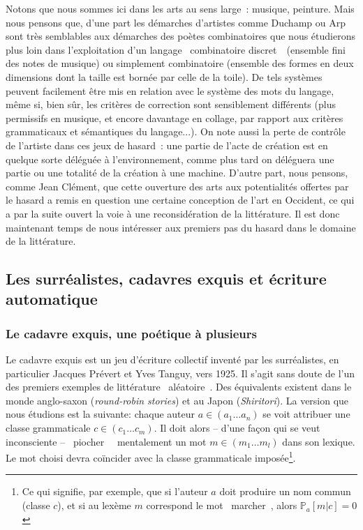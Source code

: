 \documentclass{article}
\begin{document}
			Notons que nous sommes ici dans les arts au sens large : musique, peinture. Mais nous pensons que, d'une part les démarches d'artistes comme Duchamp ou Arp sont très semblables aux démarches des poètes combinatoires que nous étudierons plus loin dans l'exploitation d'un langage \guillemotleft~combinatoire discret~\guillemotright~(ensemble fini des notes de musique) ou simplement combinatoire (ensemble des formes en deux dimensions dont la taille est bornée par celle de la toile). De tels systèmes peuvent facilement être mis en relation avec le système des mots du langage, même si, bien sûr, les critères de correction sont sensiblement différents (plus permissifs en musique, et encore davantage en collage, par rapport aux critères grammaticaux et sémantiques du langage...). On note aussi la perte de contrôle de l'artiste dans ces jeux de hasard : une partie de l'acte de création est en quelque sorte déléguée à l'environnement, comme plus tard on déléguera une partie ou une totalité de la création à une machine. D'autre part, nous pensons, comme Jean Clément, que cette ouverture des arts aux potentialités offertes par le hasard a remis en question une certaine conception de l'art en Occident, ce qui a par la suite ouvert la voie à une reconsidération de la littérature. Il est donc maintenant temps de nous intéresser aux premiers pas du hasard dans le domaine de la littérature.
		\subsection{Les surréalistes, cadavres exquis et écriture automatique}
			\subsubsection{Le cadavre exquis, une poétique à plusieurs}
				Le cadavre exquis est un jeu d'écriture collectif inventé par les surréalistes, en particulier Jacques Prévert et Yves Tanguy, vers 1925. Il s'agit sans doute de l'un des premiers exemples de littérature \guillemotleft~aléatoire~\guillemotright. Des équivalents existent dans le monde anglo-saxon (\textit{round-robin stories}) et au Japon (\textit{Shiritori}). La version que nous étudions est la suivante: chaque auteur $ a \in (a_1 \dots a_n)$ se voit attribuer une classe grammaticale $c \in (c_1 \dots c_m)$. Il doit alors -- d'une façon qui se veut inconsciente --  \guillemotleft~piocher~\guillemotright~ mentalement un mot $m \in (m_1 \dots m_l)$ dans son lexique. Le mot choisi devra coïncider avec la classe grammaticale imposée\footnote{Ce qui signifie, par exemple, que si l'auteur $a$ doit produire un nom commun (classe $c$), et si au lexème $m$ correspond le mot \guillemotleft~marcher~\guillemotright, alors $\mathbb{P}_a[m|c] = 0$}.\\
				
\end{document}
